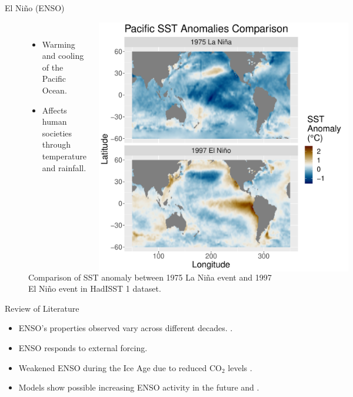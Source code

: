 \documentclass{beamer}
\begin{document}
\begin{frame}
  \begin{block}{El Niño (ENSO)}
    \begin{figure}
      \begin{columns}
        \begin{itemize}
        \item Warming and cooling of the Pacific Ocean.
        \item Affects human societies through temperature and rainfall. \citep{ropelewski1987global}
        \end{itemize}
        \caption{Comparison of SST anomaly between 1975 La Niña event and 1997 El Niño event in HadISST 1 dataset. \citep{rayner2003global}}
        \includegraphics[width=1.0\textwidth]{figures/intro_fig.pdf}
      \end{columns}
    \end{figure}
  \end{block}
  \vfill

  \begin{block}{Review of Literature}
    \begin{itemize}
    \item ENSO's properties observed vary across different decades. \citep{lubbecke2014assessing}.
    \item ENSO responds to external forcing.
    \item Weakened ENSO during the Ice Age due to reduced CO$_2$ levels \citep{zhu2017reduced}.
    \item Models show possible increasing ENSO activity in the future \citep{zheng2017response} and \citep{maher2018enso}.
    \end{itemize}
  \end{block}
  \vfill


\end{frame}
\end{document}
